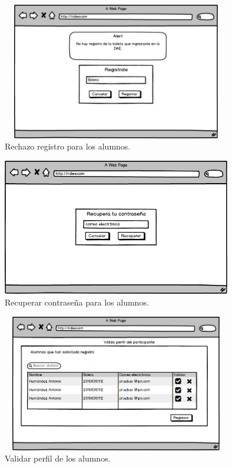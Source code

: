 	\begin{figure}[hbt!]
		\centering
		\includegraphics[width=10cm, height=6cm]{Imagenes/Disenos/VistasBorradas/p3RechazoRegistro.png}
		\caption{Rechazo registro para los alumnos.}
	\end{figure}

	\begin{figure}[hbt!]
		\centering
		\includegraphics[width=10cm, height=6cm]{Imagenes/Disenos/VistasBorradas/p5Recuperarcontrasena.png}
		\caption{Recuperar contraseña para los alumnos.}
	\end{figure}

	\begin{figure}[hbt!]
		\centering
		\includegraphics[width=10cm, height=6cm]{Imagenes/Disenos/VistasBorradas/p18ValidaPerfil.png}
		\caption{Validar perfil de los alumnos.}
	\end{figure}
	\pagebreak

	